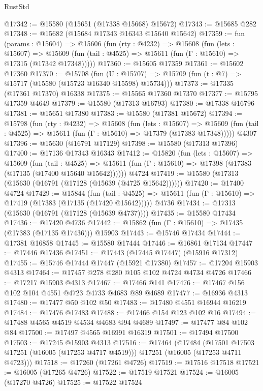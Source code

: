 \begin{lexlean}{RustStd}
\begin{coremodule}
@17342 := @15580 (@15651 (@17338 @15668) @15672)
@17343 := @15685 @282
@17348 := @15682 (@15684 @17343 @16343 @15640 @15642)
@17359 := fun (params : @15604) =>
  @15606
    (fun (rty : @4232) =>
    @15608
      (fun (lets : @15607) =>
      @15609 (fun (tail : @4525) => @15611 (fun (Γ : @15610) => @17315 (@17342 @17348)))))
@17360 := @15605 @17359
@17361 := @15602 @17360
@17370 := @15708
    (fun (U : @15707) => @15709 (fun (t : @7) => @15717 (@15580 (@15723 @16340 @15598) @15734)))
@17373 := @17335 (@17361 @17370) @16338
@17375 := @15565 @17360 @17370
@17377 := @15795 @17359 @4649
@17379 := @15580 (@17313 @16793)
@17380 := @17338 @16796
@17381 := @15651 @17380
@17383 := @15580 (@17381 @15672)
@17394 := @15798
    (fun (rty : @4232) =>
    @15608
      (fun (lets : @15607) =>
      @15609 (fun (tail : @4525) => @15611 (fun (Γ : @15610) => @17379 (@17383 @17348)))))
    @4307
@17396 := @15630 (@16791 @17129)
@17398 := @15580 (@17313 @17396)
@17400 := @17136 @17343 @16343
@17412 := @15820
    (fun (lets : @15607) =>
    @15609
      (fun (tail : @4525) =>
      @15611 (fun (Γ : @15610) => @17398 (@17383 (@17135 (@17400 @15640 @15642))))))
    @4724
@17419 := @15580 (@17313 (@15630 (@16791 (@17128 (@15639 (@4725 @15642))))))
@17420 := @17400 @4724
@17429 := @15844
    (fun (tail : @4525) => @15611 (fun (Γ : @15610) => @17419 (@17383 (@17135 (@17420 @15642)))))
    @4736
@17434 := @17313 (@15630 (@16791 (@17128 (@15639 @4737))))
@17435 := @15580 @17434
@17436 := @17420 @4736
@17442 := @15862 (fun (Γ : @15610) => @17435 (@17383 (@17135 @17436))) @15903
@17443 := @15746 @17434
@17444 := @17381 @16858
@17445 := @15580 @17444
@17446 := @16861 @17134
@17447 := @17446 @17436
@17451 := @17443 (@17445 @17447) (@15916 @17312)
@17455 := @15746 @17444 @17447 (@15921 @17380)
@17457 := @17204 @15903 @4313
@17464 := @17457 @278 @280 @105 @102 @4724 @4734 @4726
@17466 := @17217 @15903 @4313
@17467 := @17466 @141
@17476 := @17467 @156 @102 @104 @4551 @4723 @4733 @4683 @89 @4689
@17477 := @16936 @4313
@17480 := @17477 @50 @102 @50
@17483 := @17480 @4551 @16944 @16219
@17484 := @17476 @17483
@17488 := @17466 @154 @123 @102 @16
@17494 := @17488 @4565 @4519 @4534 @4683 @94 @4689
@17497 := @17477 @84 @102 @84
@17500 := @17497 @4565 @16991 @16319
@17501 := @17494 @17500
@17503 := @17245 @15903 @4313
@17516 := @17464
    (@17484
      (@17501 @17503 @17251 (@16005 (@17253 @4717 @4519)))
      @17251
      (@16005 (@17253 @4711 @4723)))
@17518 := @17260 (@17261 @4726)
@17519 := @17516 @17518
@17521 := @16005 (@17265 @4726)
@17522 := @17519 @17521
@17524 := @16005 (@17270 @4726)
@17525 := @17522 @17524

\end{coremodule}
\end{lexlean}
